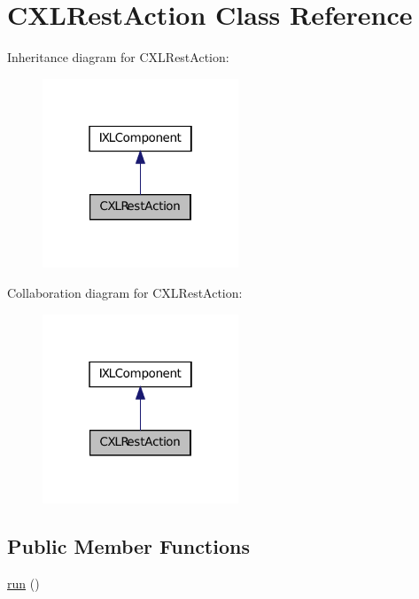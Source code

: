 \hypertarget{classCXLRestAction}{
\section{CXLRestAction Class Reference}
\label{classCXLRestAction}
}


Inheritance diagram for CXLRestAction:\nopagebreak
\begin{figure}[H]
\begin{center}
\leavevmode
\includegraphics[width=166pt]{classCXLRestAction__inherit__graph}
\end{center}
\end{figure}


Collaboration diagram for CXLRestAction:\nopagebreak
\begin{figure}[H]
\begin{center}
\leavevmode
\includegraphics[width=166pt]{classCXLRestAction__coll__graph}
\end{center}
\end{figure}
\subsection*{Public Member Functions}
\begin{DoxyCompactItemize}
\item 
\hyperlink{classCXLRestAction_afb0fafe7e02a3ae1993c01c19fad2bae}{run} ()
\end{DoxyCompactItemize}
